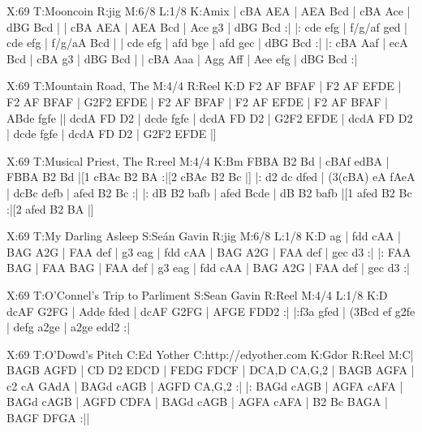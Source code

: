 \documentclass[letterpaper]{article}
\begin{document}
\begin{abc}[name]
X:69
T:Mooncoin
R:jig
M:6/8
L:1/8
K:Amix
| cBA AEA | AEA Bcd | cBA Ace | dBG Bcd |
| cBA AEA | AEA Bcd | Ace g3 | dBG Bcd :|
|: cde efg | f/g/af ged | cde efg | f/g/aA Bcd |
| cde efg | afd bge | afd gec | dBG Bcd :|
|: cBA Aaf | ecA Bcd | cBA g3 | dBG Bcd |
| cBA Aaa | Agg Aff | Aee efg | dBG Bcd :|
\end{abc}

\begin{abc}[name]
X:69
T:Mountain Road, The
M:4/4
R:Reel
K:D
F2 AF BFAF | F2 AF EFDE | F2 AF BFAF | G2F2 EFDE |
F2 AF BFAF | F2 AF EFDE | F2 AF BFAF | ABde fgfe ||
dcdA FD D2 | dcde fgfe | dcdA FD D2 | G2F2 EFDE |
dcdA FD D2 | dcde fgfe | dcdA FD D2 | G2F2 EFDE |]
\end{abc}

\begin{abc}[name]
X:69
T:Musical Priest, The
R:reel
M:4/4
K:Bm
FBBA B2 Bd | cBAf edBA | FBBA B2 Bd |[1 cBAc B2 BA :|[2 cBAc B2 Bc |]
|: d2 dc dfed | (3(cBA) eA fAeA | dcBc defb | afed B2 Bc :|
|: dB B2 bafb | afed Bcde | dB B2 bafb |[1 afed B2 Bc :|[2 afed B2 BA |]
\end{abc}

\begin{abc}[name]
X:69
T:My Darling Asleep
S:Seán Gavin
R:jig
M:6/8
L:1/8
K:D
ag | fdd cAA | BAG A2G | FAA def | g3 eag |
fdd cAA | BAG A2G | FAA def | gec d3 :|
|: FAA BAG | FAA BAG | FAA def | g3 eag |
fdd cAA | BAG A2G | FAA def | gec d3 :|
\end{abc}

\begin{abc}[name]
X:69
T:O'Connel's Trip to Parliment
S:Sean Gavin
R:Reel
M:4/4
L:1/8
K:D
dcAF G2FG | Adde fded | dcAF G2FG | AFGE FDD2 :|
|:f3a gfed | (3Bcd ef g2fe | defg a2ge | a2ge edd2 :|
\end{abc}

\begin{abc}[name]
X:69
T:O'Dowd's Pitch
C:Ed Yother
C:http://edyother.com
K:Gdor
R:Reel
M:C|
BAGB AGFD | CD D2 EDCD | FEDG FDCF | DCA,D CA,G,2 |
BAGB AGFA | c2 cA GAdA | BAGd cAGB | AGFD CA,G,2 :|
|: BAGd cAGB | AGFA cAFA | BAGd cAGB | AGFD CDFA |
BAGd cAGB | AGFA cAFA | B2 Bc BAGA | BAGF DFGA :||
\end{abc}
\end{document}
